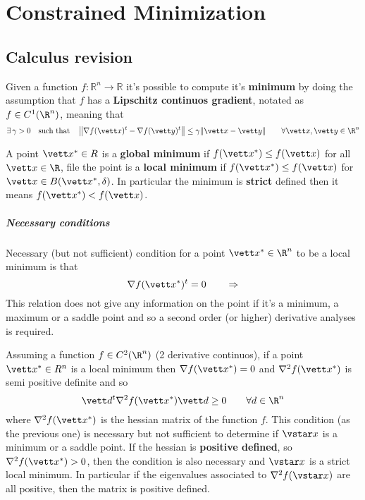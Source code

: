 \chapter{Constrained Minimization}

\section*{Calculus revision}
	Given a function $f:\mathds R^n\rightarrow \mathds R$ it's possible to compute it's \textbf{minimum} by doing the assumption that $f$ has a \textbf{Lipschitz continuos gradient}, notated as $f\in C^1(\R^n)$, meaning that
	\[ \exists \, \gamma > 0 \quad \textrm{such that} \quad \left\| \nabla f(\vett x)^t - \nabla f(\vett y)^t\right\| \leq \gamma \| \vett x - \vett y\| \qquad \forall \vett x,\vett y \in \R^n  \]
	
	A point $\vett x^*\in R$ is a \textbf{global minimum} if $f(\vett x^*) \leq f(\vett x)$ for all $\vett x\in \R$, file the point is a \textbf{local minimum} if $f(\vett x^*) \leq f(\vett x)$ for $\vett x \in B(\vett x^*,\delta)$. In particular the minimum is \textbf{strict} defined then it means $f(\vett x^*) < f(\vett x)$.
	
	\paragraph{Necessary conditions} Necessary (but not sufficient) condition for a point $\vett x^* \in \R^n$ to be a local minimum is that
	\[ \nabla f(\vett x^*)^t = 0 \qquad \Rightarrow \]
	This relation does not give any information on the point if it's a minimum, a maximum or a saddle point and so a second order (or higher) derivative analyses is required.
	
	Assuming a function $f\in C^2(\R^n)$ (2 derivative continuos), if a point $\vett x^*\in R^n$ is a local minimum then $\nabla f(\vett x^*) = 0 $ and $\nabla^2 f(\vett x^*)$ is semi positive definite and so
	\[ \vett d^t\nabla^2f(\vett x^*) \vett d \geq 0 \qquad \forall d \in \R^n \]
	where $\nabla^2f(\vett x^*)$ is the hessian matrix of the function $f$. This condition (as the previous one) is necessary but not sufficient to determine if $\vstar x$ is a minimum or a saddle point. If the hessian is \textbf{positive defined}, so $ \nabla^2f(\vett x^*) > 0$, then the condition is also necessary and $\vstar x$ is a strict local minimum. In particular if the eigenvalues associated to $\nabla^2 f(\vstar x)$ are all positive, then the matrix is positive defined.
	
